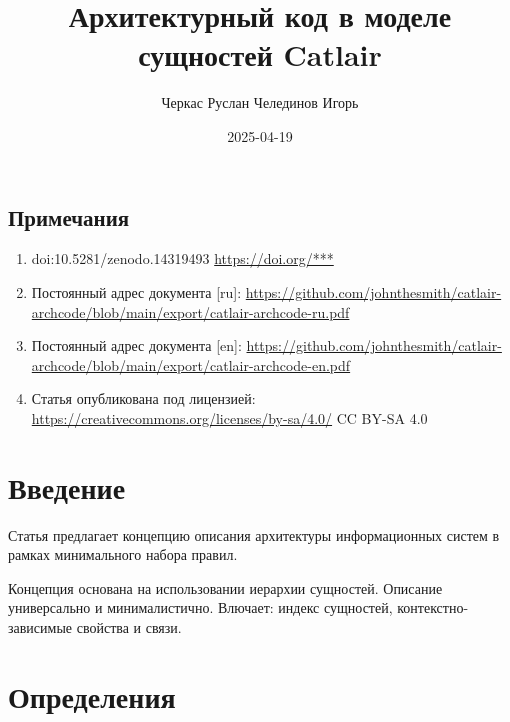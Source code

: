 \documentclass[final]{article}
\begin{document}
    \title{Архитектурный код в моделе сущностей Catlair}
    \author{
        Черкас Руслан
        Челединов Игорь
    }
    \date{2025-04-19}

    \begin{small}
        \begingroup
        \renewcommand{\baselinestretch}{0.8}

        \renewcommand{\contentsname}{Содержание}
        \maketitle
        \tableofcontents

        \section*{Примечания}
            \begin{enumerate}
                \item doi:10.5281/zenodo.14319493
                \url{https://doi.org/***}

                \item Постоянный адрес документа [ru]: 
                \url{https://github.com/johnthesmith/catlair-archcode/blob/main/export/catlair-archcode-ru.pdf}

                \item Постоянный адрес документа [en]: 
                \url{https://github.com/johnthesmith/catlair-archcode/blob/main/export/catlair-archcode-en.pdf}

                \item Статья опубликована под лицензией: 
                \url{https://creativecommons.org/licenses/by-sa/4.0/} CC BY-SA 4.0
            \end{enumerate}
        \endgroup
    \end{small}

    \section{Введение}

        Статья предлагает концепцию описания архитектуры информационных систем в 
        рамках минимального набора правил.

        Концепция основана на использовании иерархии сущностей. Описание 
        универсально и минималистично. Влючает: индекс сущностей, 
        контекстно-зависимые свойства и связи.

    \section{Определения} 
\end{document}
